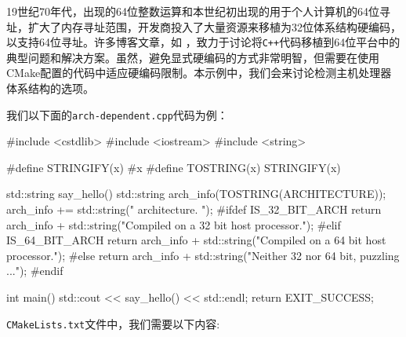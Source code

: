 19世纪70年代，出现的64位整数运算和本世纪初出现的用于个人计算机的64位寻址，扩大了内存寻址范围，开发商投入了大量资源来移植为32位体系结构硬编码，以支持64位寻址。许多博客文章，如  ，致力于讨论将\texttt{C++}代码移植到64位平台中的典型问题和解决方案。虽然，避免显式硬编码的方式非常明智，但需要在使用CMake配置的代码中适应硬编码限制。本示例中，我们会来讨论检测主机处理器体系结构的选项。


我们以下面的\texttt{arch-dependent.cpp}代码为例：

\begin{codebox}[cpp]
#include <cstdlib>
#include <iostream>
#include <string>

#define STRINGIFY(x) #x
#define TOSTRING(x) STRINGIFY(x)

std::string say_hello()
{
  std::string arch_info(TOSTRING(ARCHITECTURE));
  arch_info += std::string(" architecture. ");
#ifdef IS_32_BIT_ARCH
  return arch_info + std::string("Compiled on a 32 bit host processor.");
#elif IS_64_BIT_ARCH
  return arch_info + std::string("Compiled on a 64 bit host processor.");
#else
  return arch_info + std::string("Neither 32 nor 64 bit, puzzling ...");
#endif
}

int main()
{
  std::cout << say_hello() << std::endl;
  return EXIT_SUCCESS;
}
\end{codebox}


\texttt{CMakeLists.txt}文件中，我们需要以下内容:

